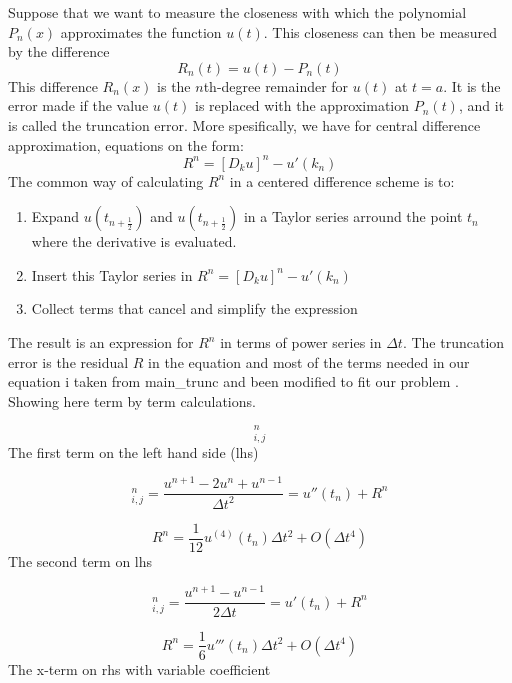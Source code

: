 \documentclass[twoside]{article}
\begin{document}
Suppose that we want to measure the closeness with which the polynomial
$P_{n}(x)$ approximates the function $u(t)$. This closeness can
then be measured by the difference 
\[
R_{n}(t)=u(t)-P_{n}(t)
\]
This difference $R_{n}(x)$ is the $n$th-degree remainder for $u(t)$
at $t=a$. It is the error made if the value $u(t)$ is replaced with
the approximation $P_{n}(t)$, and it is called the truncation error.
More spesifically, we have for central difference approximation, equations
on the form: 
\[
R^{n}=[D_{k}u]^{n}-u'(k_{n})
\]
 The common way of calculating $R^{n}$ in a centered difference
scheme is to:
\begin{enumerate}
\item Expand $u(t_{n+\frac{1}{2}})$ and $u(t_{n+\frac{1}{2}})$ in a Taylor
series arround the point $t_{n}$ where the derivative is evaluated.
\item Insert this Taylor series in $R^{n}=[D_{k}u]^{n}-u'(k_{n})$
\item Collect terms that cancel and simplify the expression
\end{enumerate}
The result is an expression for $R^{n}$ in terms of power series
in $\Delta t$. The truncation error is the residual $R$ in the equation
and most of the terms needed in our equation i taken from main\_trunc
and been modified to fit our problem . Showing here term by term calculations. 

\begin{equation}
[D_{t}D_{t}u_{e}+bD_{2t}u_{e}=D_{x}\bar{q}^{x}D_{x}u_{e}+D_{y}\bar{q}^{y}D_{y}u_{e}+f+R]_{i,j}^{n}
\end{equation}
The first term on the left hand side (lhs)

\begin{equation}
[D_{t}D_{t}u_{e}]_{i,j}^{n}=\frac{u^{n+1}-2u^{n}+u^{n-1}}{\Delta t^{2}}=u''(t_{n})+R^{n}
\end{equation}


\begin{equation}
R^{n}=\frac{1}{12}u^{(4)}(t_{n})\Delta t^{2}+O(\Delta t^{4})
\end{equation}
The second term on lhs

\begin{equation}
[D_{2t}u_{e}]_{i,j}^{n}=\frac{u^{n+1}-u^{n-1}}{2\Delta t}=u'(t_{n})+R^{n}
\end{equation}


\begin{equation}
R^{n}=\frac{1}{6}u'''(t_{n})\Delta t^{2}+O(\Delta t^{4})
\end{equation}
The x-term on rhs with variable coefficient
\end{document}
